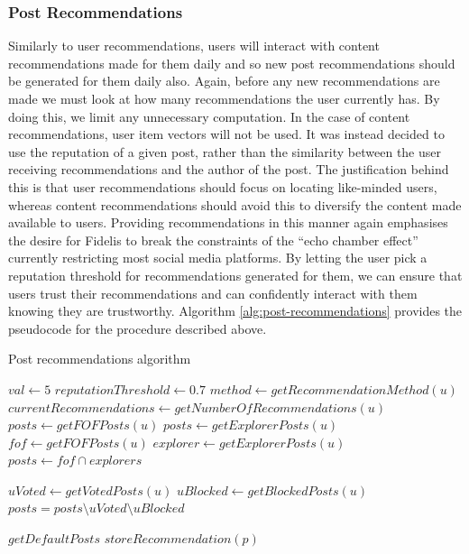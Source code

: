 \subsubsection{Post Recommendations}
\label{sec:post-recommendations}
Similarly to user recommendations, users will interact with content recommendations made for them daily and so new post recommendations should be generated for them daily also. Again, before any new recommendations are made we must look at how many recommendations the user currently has. By doing this, we limit any unnecessary computation. In the case of content recommendations, user item vectors will not be used. It was instead decided to use the reputation of a given post, rather than the similarity between the user receiving recommendations and the author of the post. The justification behind this is that user recommendations should focus on locating like-minded users, whereas content recommendations should avoid this to diversify the content made available to users. Providing recommendations in this manner again emphasises the desire for Fidelis to break the constraints of the ``echo chamber effect'' currently restricting most social media platforms. By letting the user pick a reputation threshold for recommendations generated for them, we can ensure that users trust their recommendations and can confidently interact with them knowing they are trustworthy. Algorithm \ref{alg:post-recommendations} provides the pseudocode for the procedure described above. 

\begin{algorithm}[H]
\caption{Post recommendations algorithm}
\label{alg:post-recommendations}
\begin{algorithmic}[1]
\State $val\gets 5$
\State $reputationThreshold\gets 0.7$
    \State $method\gets getRecommendationMethod(u)$
    \State $currentRecommendations\gets getNumberOfRecommendations(u)$
            \State $posts\gets getFOFPosts(u)$
        \EndIf
            \State $posts\gets getExplorerPosts(u)$
        \EndIf
            \State $fof\gets getFOFPosts(u)$
            \State $explorer\gets getExplorerPosts(u)$
            \State $posts\gets fof \cap explorers$
        \EndIf
        
        \State $uVoted\gets getVotedPosts(u)$
        \State $uBlocked\gets getBlockedPosts(u)$
        \State $posts = posts \setminus uVoted \setminus uBlocked$
        
            \State $getDefaultPosts$
        \Else
                    \State $storeRecommendation(p)$
                \EndIf
            \EndFor
        \EndIf
    \EndIf
\EndFor
\end{algorithmic}
\end{algorithm}

